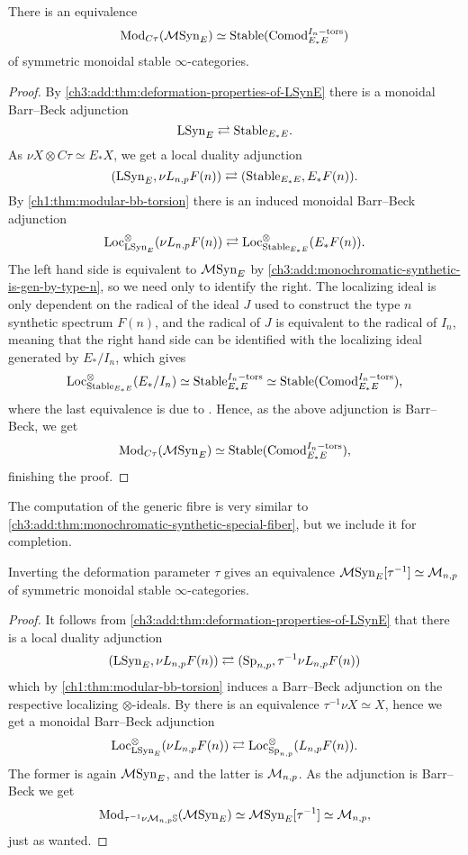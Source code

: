 \begin{theorem}
    \label{ch3:add:thm:monochromatic-synthetic-special-fiber}
    There is an equivalence
    \[\mathrm{Mod}_{C\tau}(\mathcal{M}\mathrm{Syn}_{E}) \simeq \mathrm{Stable}(\mathrm{Comod}_{E_*E}^{I_n-\mathrm{tors}})\]
    of symmetric monoidal stable $\infty$-categories. 
\end{theorem}
\begin{proof}
    By \cref{ch3:add:thm:deformation-properties-of-LSynE} there is a monoidal Barr--Beck adjunction 
    \[\mathrm{LSyn}_{E} \rightleftarrows \mathrm{Stable}_{E_*E}.\]
    As $\nu X \otimes C\tau \simeq E_{*} X$, we get a local duality adjunction 
    \[(\mathrm{LSyn}_{E}, \nu L_{n,p} F(n))\rightleftarrows (\mathrm{Stable}_{E_*E}, E_{*}F(n)).\]
    By \cref{ch1:thm:modular-bb-torsion} there is an induced monoidal Barr--Beck adjunction 
    \[\operatorname{Loc}_{\mathrm{LSyn}_{E}}^\otimes(\nu L_{n,p} F(n))\rightleftarrows \operatorname{Loc}_{\mathrm{Stable}_{E_*E}}^\otimes(E_{*}F(n)).\]
    The left hand side is equivalent to $\mathcal{M}\mathrm{Syn}_{E}$ by \cref{ch3:add:monochromatic-synthetic-is-gen-by-type-n}, so we need only to identify the right. The localizing ideal is only dependent on the radical of the ideal $J$ used to construct the type $n$ synthetic spectrum $F(n)$, and the radical of $J$ is equivalent to the radical of $I_n$, meaning that the right hand side can be identified with the localizing ideal generated by $E_{*}/I_n$, which gives 
    \[\operatorname{Loc}_{\mathrm{Stable}_{E_*E}}^\otimes(E_{*}/I_n) \simeq \mathrm{Stable}_{E_*E}^{I_n-\mathrm{tors}}\simeq \mathrm{Stable}(\mathrm{Comod}_{E_*E}^{I_n-\mathrm{tors}}),\]
    where the last equivalence is due to \cite[3.17]{barthel-heard-valenzuela_2020}. Hence, as the above adjunction is Barr--Beck, we get 
    \[\mathrm{Mod}_{C\tau}(\mathcal{M}\mathrm{Syn}_{E}) \simeq \mathrm{Stable}(\mathrm{Comod}_{E_*E}^{I_n-\mathrm{tors}}),\]
    finishing the proof. 
\end{proof}

The computation of the generic fibre is very similar to \cref{ch3:add:thm:monochromatic-synthetic-special-fiber}, but we include it for completion. 

\begin{theorem}
    Inverting the deformation parameter $\tau$ gives an equivalence $\mathcal{M}\mathrm{Syn}_{E}[\tau^{-1}] \simeq \mathcal{M}_{n,p}$ of symmetric monoidal stable $\infty$-categories. 
\end{theorem}
\begin{proof}
    It follows from \cref{ch3:add:thm:deformation-properties-of-LSynE} that there is a local duality adjunction 
    \[(\mathrm{LSyn}_{E}, \nu L_{n,p} F(n)) \rightleftarrows (\mathrm{Sp}_{n,p}, \tau^{-1}\nu L_{n,p} F(n))\]
    which by \cref{ch1:thm:modular-bb-torsion} induces a Barr--Beck adjunction on the respective localizing $\otimes$-ideals. By \cite[4.40]{pstragowski_2022} there is an equivalence $\tau^{-1}\nu X \simeq X$, hence we get a monoidal Barr--Beck adjunction 
    \[\operatorname{Loc}_{\mathrm{LSyn}_{E}}^\otimes(\nu L_{n,p} F(n))\rightleftarrows \operatorname{Loc}_{\mathrm{Sp}_{n,p}}^\otimes(L_{n,p} F(n)).\]
    The former is again $\mathcal{M}\mathrm{Syn}_{E}$, and the latter is $\mathcal{M}_{n,p}$. As the adjunction is Barr--Beck we get 
    \[\mathrm{Mod}_{\tau^{-1}\nu \mathcal{M}_{n,p}\mathbb{S}}(\mathcal{M}\mathrm{Syn}_{E})\simeq \mathcal{M}\mathrm{Syn}_{E}[\tau^{-1}]\simeq \mathcal{M}_{n,p},\]
    just as wanted. 
\end{proof}

